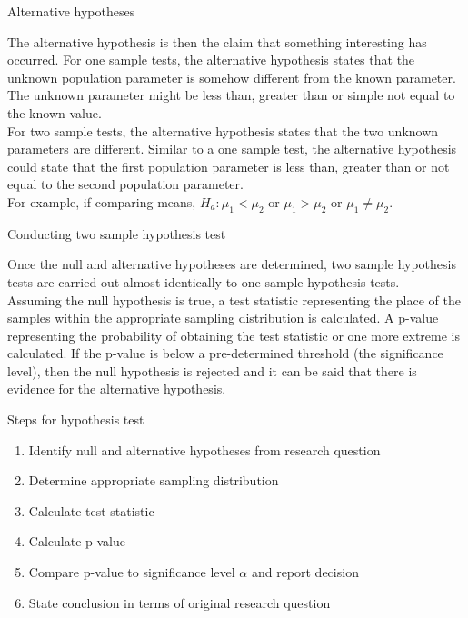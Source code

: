 \documentclass[xcolor=table, handout]{beamer}
\begin{document}
\begin{frame}{Alternative hypotheses}
\begin{block}{}
\large
The alternative hypothesis is then the claim that something interesting has occurred. For one sample tests, the alternative hypothesis states that the unknown population parameter is somehow different from the known parameter. The unknown parameter might be less than, greater than or simple not equal to the known value. \\
\pause\medskip
For two sample tests, the alternative hypothesis states that the two unknown parameters are different. Similar to a one sample test, the alternative hypothesis could state that the first population parameter is less than, greater than or not equal to the second population parameter.\\
\pause\medskip
For example, if comparing means, $H_a: \mu_1 < \mu_2$ or $\mu_1 > \mu_2$ or $\mu_1 \ne \mu_2$.
\end{block}
\end{frame}

\begin{frame}{Conducting two sample hypothesis test}
\begin{block}{}
\large
Once the null and alternative hypotheses are determined, two sample hypothesis tests are carried out almost identically to one sample hypothesis tests.\\
\medskip
Assuming the null hypothesis is true, a test statistic representing the place of the samples within the appropriate sampling distribution is calculated. A p-value representing the probability of obtaining the test statistic or one more extreme is calculated. If the p-value is below a pre-determined threshold (the significance level), then the null hypothesis is rejected and it can be said that there is evidence for the alternative hypothesis.
\end{block}
\end{frame}

\begin{frame}{Steps for hypothesis test}
\begin{block}{}
\large
\begin{enumerate}
\item Identify null and alternative hypotheses from research question
\item Determine appropriate sampling distribution
\item Calculate test statistic
\item Calculate p-value
\item Compare p-value to significance level $\alpha$ and report decision
\item State conclusion in terms of original research question
\end{enumerate}
\end{block}
\end{frame}
\end{document}
